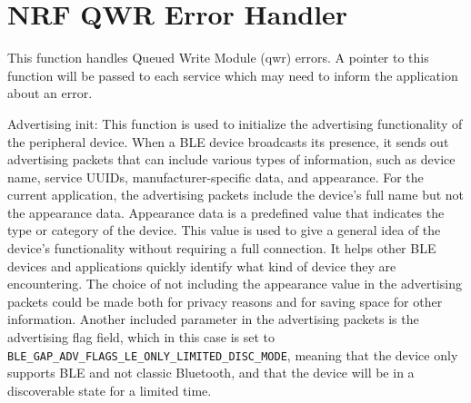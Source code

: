 \documentclass{Configuration_Files/PoliMi3i_thesis}
\begin{document}

\section*{NRF QWR Error Handler}

This function handles Queued Write Module (qwr) errors. A pointer to this function will be passed to each service which may need to inform the application about an error.

Advertising init: This function is used to initialize the advertising functionality of the peripheral device. When a BLE device broadcasts its presence, it sends out advertising packets that can include various types of information, such as device name, service UUIDs, manufacturer-specific data, and appearance. For the current application, the advertising packets include the device’s full name but not the appearance data. Appearance data is a predefined value that indicates the type or category of the device. This value is used to give a general idea of the device's functionality without requiring a full connection. It helps other BLE devices and applications quickly identify what kind of device they are encountering. The choice of not including the appearance value in the advertising packets could be made both for privacy reasons and for saving space for other information. Another included parameter in the advertising packets is the advertising flag field, which in this case is set to \texttt{BLE\_GAP\_ADV\_FLAGS\_LE\_ONLY\_LIMITED\_DISC\_MODE}, meaning that the device only supports BLE and not classic Bluetooth, and that the device will be in a discoverable state for a limited time. 
\end{document}
